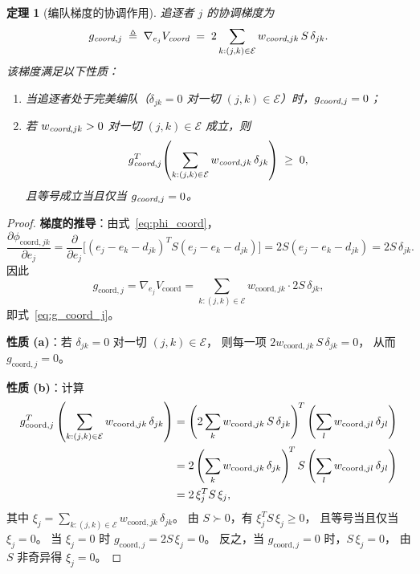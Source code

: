 \documentclass[a4paper,11pt]{article}
\theoremstyle{plain}
\newtheorem{theorem}{定理}[section]
\theoremstyle{definition}
\theoremstyle{remark}
\newcommand{\cE}{\mathcal{E}}
\begin{document}
\begin{theorem}[编队梯度的协调作用]\label{thm:coord_gradient}
  追逐者 $j$ 的协调梯度为
  \begin{equation}\label{eq:g_coord_j}
    g_{\emph{coord},j}
    \;\triangleq\; \nabla_{e_j} V_{\emph{coord}}
    \;=\; 2 \sum_{k:(j,k)\in\cE} w_{\emph{coord},jk}\, S\, \delta_{jk}.
  \end{equation}
  该梯度满足以下性质：
  \begin{enumerate}[label=(\alph*)]
    \item 当追逐者处于完美编队（$\delta_{jk} = 0$ 对一切
      $(j,k)\in\cE$）时，$g_{\emph{coord},j} = 0$；
    \item 若 $w_{\emph{coord},jk} > 0$ 对一切 $(j,k)\in\cE$ 成立，则
      \begin{equation}\label{eq:descent}
        g_{\emph{coord},j}^T\!
        \left(\sum_{k:(j,k)\in\cE} w_{\emph{coord},jk}\, \delta_{jk}\right)
        \;\ge\; 0,
      \end{equation}
      且等号成立当且仅当 $g_{\emph{coord},j} = 0$。
  \end{enumerate}
\end{theorem}

\begin{proof}
  \textbf{梯度的推导}：由式~\eqref{eq:phi_coord}，
  \begin{equation}\label{eq:grad_coord_calc}
    \frac{\partial \phi_{\text{coord},jk}}{\partial e_j}
    = \frac{\partial}{\partial e_j}
      \bigl[(e_j - e_k - d_{jk})^T S (e_j - e_k - d_{jk})\bigr]
    = 2S(e_j - e_k - d_{jk})
    = 2S\,\delta_{jk}.
  \end{equation}
  因此
  \[
    g_{\text{coord},j}
    = \nabla_{e_j} V_{\text{coord}}
    = \sum_{k:(j,k)\in\cE} w_{\text{coord},jk}
      \cdot 2S\,\delta_{jk},
  \]
  即式~\eqref{eq:g_coord_j}。

  \textbf{性质 (a)}：若 $\delta_{jk} = 0$ 对一切 $(j,k)\in\cE$，
  则每一项 $2w_{\text{coord},jk}\, S\,\delta_{jk} = 0$，
  从而 $g_{\text{coord},j} = 0$。

  \textbf{性质 (b)}：计算
  \begin{align}
    g_{\text{coord},j}^T
    \left(\sum_{k:(j,k)\in\cE} w_{\text{coord},jk}\, \delta_{jk}\right)
    &= \left(2\sum_{k} w_{\text{coord},jk}\, S\,\delta_{jk}\right)^{\!T}
       \left(\sum_{l} w_{\text{coord},jl}\, \delta_{jl}\right)
    \notag\\
    &= 2\left(\sum_{k} w_{\text{coord},jk}\, \delta_{jk}\right)^{\!T}
       S
       \left(\sum_{l} w_{\text{coord},jl}\, \delta_{jl}\right)
    \notag\\
    &= 2\, \xi_j^T S\, \xi_j,
    \label{eq:descent_calc}
  \end{align}
  其中 $\xi_j = \sum_{k:(j,k)\in\cE} w_{\text{coord},jk}\, \delta_{jk}$。
  由 $S \succ 0$，有 $\xi_j^T S\, \xi_j \ge 0$，
  且等号当且仅当 $\xi_j = 0$。
  当 $\xi_j = 0$ 时 $g_{\text{coord},j} = 2S\,\xi_j = 0$。
  反之，当 $g_{\text{coord},j} = 0$ 时，$S\,\xi_j = 0$，
  由 $S$ 非奇异得 $\xi_j = 0$。
\end{proof}
\end{document}
